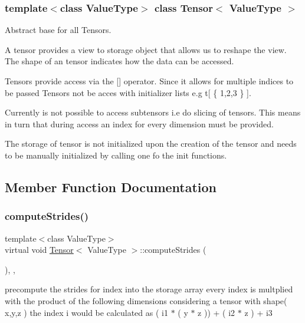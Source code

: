 \subsubsection*{template$<$class Value\+Type$>$\newline
class Tensor$<$ Value\+Type $>$}

Abstract base for all Tensors.

A tensor provides a view to storage object that allows us to reshape the view. The shape of an tensor indicates how the data can be accessed.

Tensors provide access via the \mbox{[}\mbox{]} operator. Since it allows for multiple indices to be passed Tensors not be acces with initializer lists e.\+g t\mbox{[} \{ 1,2,3 \} \mbox{]}.

Currently is not possible to access subtensors i.\+e do slicing of tensors. This means in turn that during access an index for every dimension must be provided.

The storage of tensor is not initialized upon the creation of the tensor and needs to be manually initialized by calling one fo the {\ttfamily init} functions. 

\subsection{Member Function Documentation}
\mbox{\label{classTensor_a22b23dcd3dbe86924e01d13476f44204}} 
\subsubsection{\texorpdfstring{compute\+Strides()}{computeStrides()}}
{\footnotesize\ttfamily template$<$class Value\+Type$>$ \\
virtual void \hyperlink{classTensor}{Tensor}$<$ Value\+Type $>$\+::compute\+Strides (\begin{DoxyParamCaption}{ }\end{DoxyParamCaption})\hspace{0.3cm}{\ttfamily [inline]}, {\ttfamily [protected]}, {\ttfamily [virtual]}}

precompute the strides for index into the storage array every index is multplied with the product of the following dimensions considering a tensor with shape( x,y,z ) the index i would be calculated as ( i1 $\ast$ ( y $\ast$ z )) + ( i2 $\ast$ z ) + i3 

